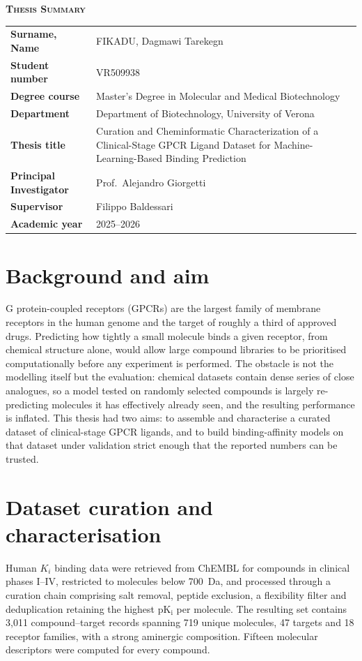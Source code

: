 \documentclass[11pt,a4paper]{article}
\newcommand{\metarow}[2]{\textbf{#1} & #2 \\}
\begin{document}
\begin{center}
  {\large\bfseries\scshape Thesis Summary}
\end{center}
\vspace{4pt}

\noindent
\begin{tabularx}{\textwidth}{@{}p{}X@{}}
  \metarow{Surname, Name}{FIKADU, Dagmawi Tarekegn}
  \metarow{Student number}{VR509938}
  \metarow{Degree course}{Master's Degree in Molecular and Medical Biotechnology}
  \metarow{Department}{Department of Biotechnology, University of Verona}
  \metarow{Thesis title}{Curation and Cheminformatic Characterization of a
        Clinical-Stage GPCR Ligand Dataset for Machine-Learning-Based Binding
        Prediction}
  \metarow{Principal Investigator}{Prof.\ Alejandro Giorgetti}
  \metarow{Supervisor}{Filippo Baldessari}
  \metarow{Academic year}{2025--2026}
\end{tabularx}

\vspace{6pt}

\section{Background and aim}
G protein-coupled receptors (GPCRs) are the largest family of membrane receptors in the
human genome and the target of roughly a third of approved drugs. Predicting how tightly a
small molecule binds a given receptor, from chemical structure alone, would allow large
compound libraries to be prioritised computationally before any experiment is performed.
The obstacle is not the modelling itself but the evaluation: chemical datasets contain
dense series of close analogues, so a model tested on randomly selected compounds is
largely re-predicting molecules it has effectively already seen, and the resulting
performance is inflated. This thesis had two aims: to assemble and characterise a curated
dataset of clinical-stage GPCR ligands, and to build binding-affinity models on that
dataset under validation strict enough that the reported numbers can be trusted.

\section{Dataset curation and characterisation}
Human $K_i$ binding data were retrieved from ChEMBL for compounds in clinical phases
I--IV, restricted to molecules below 700~Da, and processed through a curation chain
comprising salt removal, peptide exclusion, a flexibility filter and deduplication
retaining the highest $\mathrm{pK_i}$ per molecule. The resulting set contains 3,011
compound--target records spanning 719 unique molecules, 47 targets and 18 receptor
families, with a strong aminergic composition. Fifteen molecular descriptors were computed
for every compound.
\end{document}
